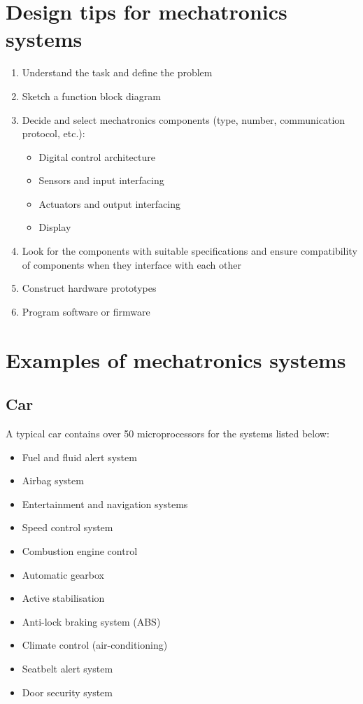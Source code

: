 \documentclass[11pt]{article}
\begin{document}
\section{Design tips for mechatronics systems}
\label{sec:org42b0cfe}
\begin{enumerate}
\item Understand the task and define the problem
\item Sketch a function block diagram
\item Decide and select mechatronics components (type, number, communication protocol, etc.):
\begin{itemize}
\item Digital control architecture
\item Sensors and input interfacing
\item Actuators and output interfacing
\item Display
\end{itemize}
\item Look for the components with suitable specifications and ensure compatibility of components when they interface with each other
\item Construct hardware prototypes
\item Program software or firmware
\end{enumerate}
\section{Examples of mechatronics systems}
\label{sec:org0db7211}

\subsection{Car}
\label{sec:org7f396f0}
A typical car contains over 50 microprocessors for the systems listed below:
\begin{itemize}
\item Fuel and fluid alert system
\item Airbag system
\item Entertainment and navigation systems
\item Speed control system
\item Combustion engine control
\item Automatic gearbox
\item Active stabilisation
\item Anti-lock braking system (ABS)
\item Climate control (air-conditioning)
\item Seatbelt alert system
\item Door security system
\end{itemize}
\end{document}
